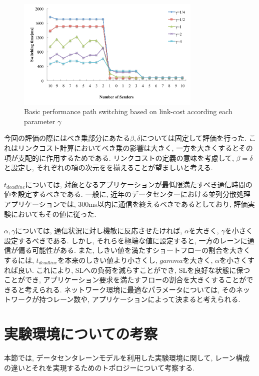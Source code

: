 \begin{figure}[t]
    \begin{center}
    \includegraphics[autoebb, width=250pt]{./img/param_gamma.pdf}
    \caption{Basic performance path switching based on
    link-cost according each parameter $\gamma$}
    \label{fig:basic_para_dead}
    \end{center}
\end{figure}

今回の評価の際にはべき乗部分にあたる$\beta, \delta$については固定して評価を行った. 
これはリンクコスト計算においてべき乗の影響は大きく, 一方を大きくするとその項が支配的に作用するためである. 
リンクコストの定義の意味を考慮して, $\beta=\delta$と設定し, それぞれの項の次元をを揃えることが望ましいと考える. 

$t_{deadline}$については, 対象となるアプリケーションが最低限満たすべき通信時間の値を設定するべきである. 
一般に, 近年のデータセンターにおける並列分散処理アプリケーションでは, 300ms以内に通信を終えるべき\cite{key-value2}であるとしており,
評価実験においてもその値に従った.

$\alpha, \gamma$については, 通信状況に対し機敏に反応させたければ, $\alpha$を大きく, $\gamma$を小さく設定するべきである. 
しかし, それらを極端な値に設定すると, 一方のレーンに通信が偏る可能性がある. 
また, しきい値を満たすショートフローの割合を大きくするには, $t_{deadline}$を本来のしきい値より小さくし, $gamma$を大きく,
$\alpha$を小さくすれば良い. 
これにより, SLへの負荷を減らすことができ, SLを良好な状態に保つことができ,
アプリケーション要求を満たすフローの割合を大きくすることができると考えられる. 
ネットワーク環境に最適なパラメータについては, そのネットワークが持つレーン数や, アプリケーションによって決まると考えられる. 

\section{実験環境についての考察}
本節では, データセンタレーンモデルを利用した実験環境に関して, レーン構成の違いとそれを実現するためのトポロジーについて考察する. 

